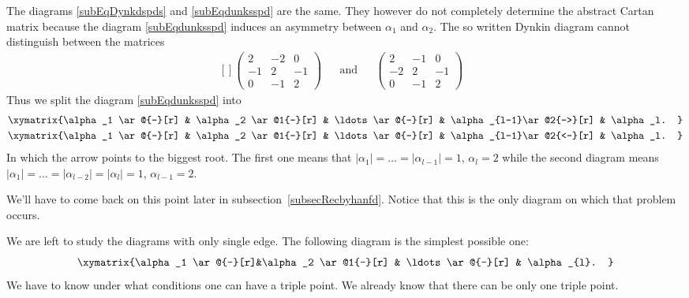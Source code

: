 The diagrams \eqref{subEqDynkdspds} and \eqref{subEqdunksspd} are the same. They however do not completely determine the abstract Cartan matrix because the diagram \eqref{subEqdunksspd} induces an asymmetry between \( \alpha_1\) and \( \alpha_2\). The so written Dynkin diagram cannot distinguish between the matrices
\begin{equation}
	\begin{aligned}[]
		\begin{pmatrix}
			2  & -2 & 0  \\
			-1 & 2  & -1 \\
			0  & -1 & 2
		\end{pmatrix} &   &
		\text{and}      &   &
		\begin{pmatrix}
			2  & -1 & 0  \\
			-2 & 2  & -1 \\
			0  & -1 & 2
		\end{pmatrix} &
	\end{aligned}
\end{equation}
Thus we split the diagram \eqref{subEqdunksspd} into
\begin{subequations}        \label{suBeqdfynkabGP}
	\begin{align}
		\xymatrix{%
		\alpha_1 \ar@{-}[r] & \alpha_2  \ar@1{-}[r] & \ldots \ar@{-}[r] & \alpha_{l-1}\ar@2{->}[r] & \alpha_l.
		}                                                                                                      \\
		\xymatrix{%
		\alpha_1 \ar@{-}[r] & \alpha_2  \ar@1{-}[r] & \ldots \ar@{-}[r] & \alpha_{l-1}\ar@2{<-}[r] & \alpha_l.
		}
	\end{align}
\end{subequations}
In which the arrow points to the biggest root. The first one means that \( | \alpha_1 |=\ldots=| \alpha_{l-1} |=1\), \( \alpha_{l}=2\) while the second diagram means \( | \alpha_1 |=\ldots=| \alpha_{l-2} |=| \alpha_l |=1\), \( \alpha_{l-1}=2\).

We'll have to come back on this point later in subsection~\ref{subsecRecbyhanfd}. Notice that this is the only diagram on which that problem occurs.

We are left to study the diagrams with only single edge. The following diagram is the simplest possible one:
\begin{equation}
	\xymatrix{%
		\alpha_1 \ar@{-}[r]&\alpha_2  \ar@1{-}[r]   & \ldots \ar@{-}[r] & \alpha_{l}.
	}
\end{equation}
We have to know under what conditions one can have a triple point. We already know that there can be only one triple point.

